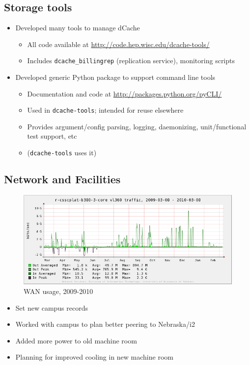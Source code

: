\documentclass{beamer}
\begin{document}
\subsection{Storage tools}
\begin{frame}
\begin{itemize}
	\item Developed many tools to manage dCache
	\begin{itemize}
		\item All code available at \url{http://code.hep.wisc.edu/dcache-tools/}
		\item Includes {\tt dcache_billingrep} (replication service), monitoring scripts
	\end{itemize}
	\item Developed generic Python package to support command line tools
	\begin{itemize}
		\item Documentation and code at \url{http://packages.python.org/pyCLI/}
		\item Used in {\tt dcache-tools}; intended for reuse elsewhere
		\item Provides argument/config parsing, logging, daemonizing, unit/functional test support, etc
		\item ({\tt dcache-tools} uses it)
	\end{itemize}
\end{itemize}
\end{frame}

\subsection{Network and Facilities}
\begin{frame}
\begin{figure}
	\includegraphics[width=\textwidth]{Graphics/network-1yr.png}
	\caption{WAN usage, 2009-2010}
\end{figure}

\begin{itemize}
	\item Set new campus records
	\item Worked with campus to plan better peering to Nebraska/i2
	\item Added more power to old machine room
	\item Planning for improved cooling in new machine room
\end{itemize}
\end{frame}
\end{document}
